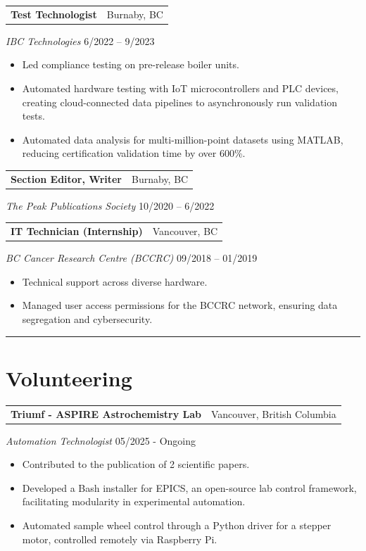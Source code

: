 \documentclass[a4paper,10pt]{article}
\makeatletter
\newcommand{\leadership}[5]{
	{
		\vspace{1.5mm}
		\noindent
		\begin{tabular*}{\textwidth}{@{\extracolsep{\fill}} l r}
			\textbf{#1} & #2 \\
		\end{tabular*}
		
		\noindent\textit{#3} \hfill #4 \\
		\vspace{-5mm}
		\begin{itemize}
			
			\setlength{\itemsep}{-1mm}   %
			\setlength{\topsep}{-4mm}
			\setlength{\parsep}{0mm}
			#5
		\end{itemize}
	}
}
\newcommand{\work}[5]{
	{
		\vspace{1.5mm}
		\noindent
		\begin{tabular*}{\textwidth}{@{\extracolsep{\fill}} l r}
			\textbf{#1} & #2 \\
		\end{tabular*}
		\vspace{-5mm}
		\textit{#3} \hfill #4 \\
		\begin{itemize}
			\setlength{\itemsep}{-1mm}
			\setlength{\topsep}{0mm}
			\setlength{\parsep}{0mm}
			#5
		\end{itemize}
	}
}
\newcommand{\workbrief}[4]{
	{
		\vspace{1.5mm}
		\noindent
		\begin{tabular*}{\textwidth}{@{\extracolsep{\fill}} l r}
			\textbf{#1} & #2 \\
		\end{tabular*}
		\vspace{-5mm}
		\textit{#3} \hfill #4 \\
		\vspace{1.8mm}
	}
}
\makeatother
\begin{document}
	\work
	{Test Technologist}
	{Burnaby, BC}
	{IBC Technologies}
	{6/2022 – 9/2023}
	{
		\item Led compliance testing on pre-release boiler units.
			
		\item Automated hardware testing with IoT microcontrollers and PLC devices, creating cloud-connected data pipelines to asynchronously run validation tests.
		
		\item Automated data analysis for multi-million-point datasets using MATLAB, reducing certification validation time by over 600\%.
	}
		
	\workbrief
	{Section Editor, Writer}
	{Burnaby, BC}
	{The Peak Publications Society}
	{10/2020 – 6/2022}
	

	
	
	\work
	{IT Technician (Internship)}
	{Vancouver, BC}
	{BC Cancer Research Centre (\textnormal{BCCRC})}
	{09/2018 – 01/2019}
	{
		\item Technical support across diverse hardware.
		\item Managed user access permissions for the BCCRC network, ensuring data segregation and cybersecurity.
	}
	
	
	
\noindent\rule{\textwidth}{0.4pt}
\section*{Volunteering}

		\leadership
		{Triumf - ASPIRE Astrochemistry Lab}
		{Vancouver, British Columbia}
		{Automation Technologist}
		{05/2025 - Ongoing}
		{
			\item Contributed to the publication of 2 scientific papers.
			\item Developed a Bash installer for EPICS, an open-source lab control framework, facilitating modularity in experimental automation.
			\item Automated sample wheel control through a Python driver for a stepper motor, controlled remotely via Raspberry Pi.
		}

	
\end{document}
